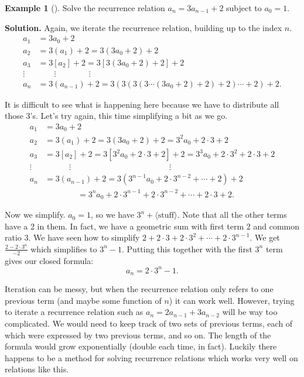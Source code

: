 \documentclass[12pt,]{book}
\theoremstyle{plain}
\theoremstyle{definition}
\theoremstyle{definition}
\newtheorem{example}[theorem]{Example}
\theoremstyle{definition}
\numberwithin{equation}{chapter}
\newcommand{\amp}{&}
\begin{document}
\begin{example}[]\label{example-22}
\hypertarget{p-315}{}%
Solve the recurrence relation \(a_n = 3a_{n-1} + 2\) subject to \(a_0 = 1\).%
\par\smallskip%
\noindent\textbf{Solution.}\hypertarget{solution-36}{}\quad%
\hypertarget{p-316}{}%
Again, we iterate the recurrence relation, building up to the index \(n\).%
\begin{align*}
a_1 \amp = 3a_0 + 2\\
a_2 \amp = 3(a_1) + 2 = 3(3a_0 + 2) + 2\\
a_3 \amp = 3[a_2] + 2 = 3[3(3a_0 + 2) + 2] + 2\\
\vdots \amp \qquad \vdots \qquad \qquad \vdots\\
a_n \amp = 3(a_{n-1}) + 2 = 3(3(3(3\cdots(3a_0 + 2) + 2) + 2)\cdots + 2)+ 2.
\end{align*}
%
\par
\hypertarget{p-317}{}%
It is difficult to see what is happening here because we have to distribute all those 3's. Let's try again, this time simplifying a bit as we go.%
\begin{align*}
a_1 \amp = 3a_0 + 2\\
a_2 \amp = 3(a_1) + 2 = 3(3a_0 + 2) + 2 = 3^2a_0 + 2\cdot 3 + 2\\
a_3 \amp = 3[a_2] + 2 = 3[3^2a_0 + 2\cdot 3 + 2] + 2 = 3^3 a_0 + 2 \cdot 3^2 + 2 \cdot 3 + 2\\
\vdots \amp \qquad\quad \vdots \hspace{2in} \vdots\\
a_n \amp = 3(a_{n-1}) + 2 = 3(3^{n-1}a_0 + 2 \cdot 3^{n-2} + \cdots +2)+ 2\\
\amp \qquad \qquad = 3^n a_0 + 2\cdot 3^{n-1} + 2 \cdot 3^{n-2} + \cdots + 2\cdot 3 + 2.
\end{align*}
%
\par
\hypertarget{p-318}{}%
Now we simplify. \(a_0 = 1\), so we have \(3^n + \langle\text{stuff}\rangle\). Note that all the other terms have a 2 in them. In fact, we have a geometric sum with first term \(2\) and common ratio \(3\). We have seen how to simplify \(2 + 2\cdot 3 + 2 \cdot 3^2 + \cdots + 2\cdot 3^{n-1}\). We get \(\frac{2-2\cdot 3^n}{-2}\) which simplifies to \(3^n - 1\). Putting this together with the first \(3^n\) term gives our closed formula:%
\begin{equation*}
a_n = 2\cdot 3^n - 1.
\end{equation*}
%
\end{example}
\hypertarget{p-319}{}%
Iteration can be messy, but when the recurrence relation only refers to one previous term (and maybe some function of \(n\)) it can work well. However, trying to iterate a recurrence relation such as \(a_n = 2 a_{n-1} + 3 a_{n-2}\) will be way too complicated. We would need to keep track of two sets of previous terms, each of which were expressed by two previous terms, and so on. The length of the formula would grow exponentially (double each time, in fact). Luckily there happens to be a method for solving recurrence relations which works very well on relations like this.%
\typeout{************************************************}
\typeout{************************************************}
\end{document}
